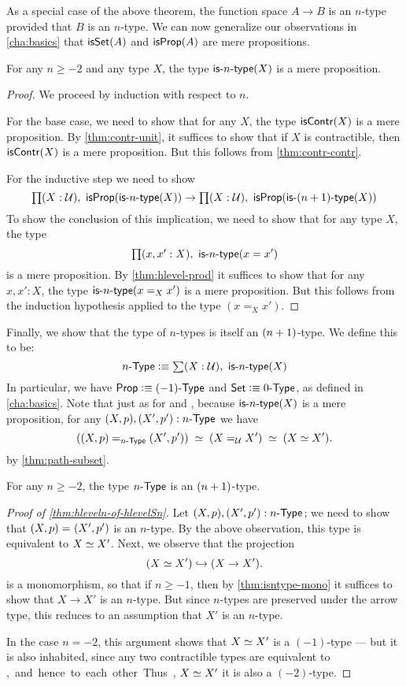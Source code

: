 As a special case of the above theorem, the function space $A \to B$ is an $n$-type provided that $B$ is an $n$-type.
We can now generalize our observations in \autoref{cha:basics} that $\isset(A)$ and $\isprop(A)$ are mere propositions.

\begin{thm}\label{thm:isaprop-isofhlevel}
 For any $n \geq -2$ and any type $X$, the type $\istype{n}(X)$ is a mere proposition.
\end{thm}
\begin{proof}
  We proceed by induction with respect to $n$.

 For the base case, we need to show that for any $X$, the type $\iscontr(X)$ is a mere proposition.
 By \autoref{thm:contr-unit}, it suffices to show that if $X$ is contractible, then $\iscontr(X)$ is a mere proposition.
 But this follows from \autoref{thm:contr-contr}.

For the inductive step we need to show
\[\prd{X : \type} \isprop (\istype{n}(X)) \to \prd{X : \type} \isprop (\istype{\nplusone}(X)) \]
To show the conclusion of this implication, we need to show that for any type $X$, the type
\[\prd{x, x' : X}\istype{n}(x = x')\]
is a mere proposition. By \autoref{thm:hlevel-prod} it suffices to show that for any $x, x' : X$, the type $\istype{n}(x =_X x')$ is a mere
proposition.
But this follows from the induction hypothesis applied to the type $(x =_X x')$.
\end{proof}

Finally, we show that the type of $n$-types is itself an $\nplusone$-type.
We define this to be:
\[\ntype{n} \defeq \sm{X : \type} \istype{n}(X) \]
In particular, we have $\prop \defeq \ntype{(-1)}$ and $\set \defeq \ntype{0}$, as defined in \autoref{cha:basics}.
Note that just as for \prop and \set, because $\istype{n}(X)$ is a mere proposition, for any $(X,p), (X',p'):\ntype{n}$ we have
\[ (\id[\ntype{n}]{(X, p)}{(X', p')}) \;\simeq\; (\id[\type] X X') \;\simeq\; (\eqv{X}{X'}).\]
by \autoref{thm:path-subset}.

\begin{thm}\label{thm:hleveln-of-hlevelSn}
 For any $n \geq -2$, the type $\ntype{n}$ is an $\nplusone$-type.
\end{thm}
\begin{proof}[Proof of \autoref{thm:hleveln-of-hlevelSn}]
  Let $(X, p), (X', p') : \ntype{n}$; we need to show that $\id{(X, p)}{(X', p')}$ is an $n$-type.
  By the above observation, this type is equivalent to $\eqv{X}{X'}$.
  Next, we observe that the projection
  \[(\eqv{X}{X'}) \hookrightarrow (X \rightarrow X').\]
  is a monomorphism, so that if $n\geq -1$, then by \autoref{thm:isntype-mono} it suffices to show that $X \rightarrow X'$ is an $n$-type.
  But since $n$-types are preserved under the arrow type, this reduces to an assumption that $X'$ is an $n$-type.

  In the case $n=-2$, this argument shows that $\eqv{X}{X'}$ is a $(-1)$-type --- but it is also inhabited, since any two contractible types
are equivalent to \unit, and hence to each other.
  Thus, $\eqv{X}{X'}$ it is also a $(-2)$-type.
\end{proof}

